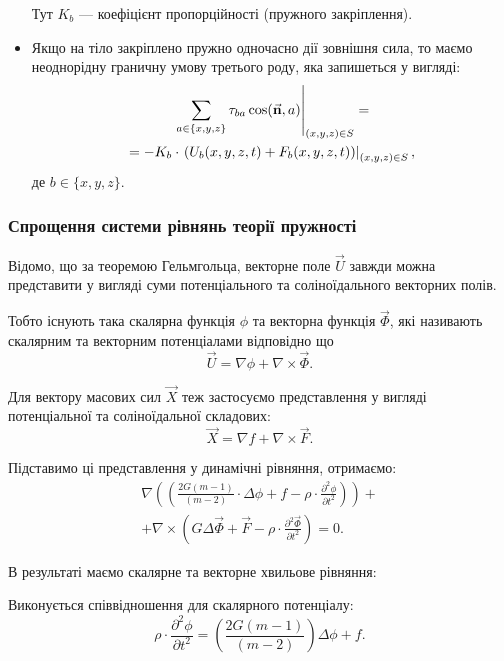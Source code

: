 \begin{itemize}
	\begin{remark}
		Тут $K_b$ --- коефіцієнт пропорційності (пружного закріплення).
	\end{remark}

	\item Якщо на тіло закріплено пружно одночасно дії зовнішня сила, то маємо неоднорідну граничну умову третього роду, яка запишеться у вигляді:
	\begin{multline}
		\left. \displaystyle\sum\limits_{a \in \{x, y, z\}} \tau_{b a} \cos(\vec{\textbf{n}}, a) \right|_{(x, y, z) \in S} = \\
		= - K_b \cdot \left. \left( U_b(x, y, z, t) + F_b(x, y, z, t) \right) \right|_{(x, y, z) \in S},
	\end{multline}
	де $b \in \{x, y, z\}$.
\end{itemize}

\subsubsection{Спрощення системи рівнянь теорії пружності}

Відомо, що за теоремою Гельмгольца, векторне поле $\vec U$ завжди можна представити у вигляді суми потенціального та соліноїдального векторних полів. \medskip

Тобто існують така скалярна функція $\phi$ та векторна функція $\vec \Phi$, які називають скалярним та векторним потенціалами відповідно що
\begin{equation}
	\vec U = \nabla \phi + \nabla \times \vec \Phi.
\end{equation}

Для вектору масових сил $\vec X$ теж застосуємо представлення у вигляді потенціальної та соліноїдальної складових:
\begin{equation}
	\vec X = \nabla f + \nabla \times \vec F.
\end{equation}

Підставимо ці представлення у динамічні рівняння, отримаємо:
\begin{multline}
	\nabla \left( \left( \frac{2 G (m - 1)}{(m - 2)} \cdot \Delta \phi + f - \rho \cdot \frac{\partial^2 \phi}{\partial t^2} \right) \right) + \\
	+ \nabla \times \left( G \Delta \vec \Phi + \Vec F - \rho \cdot \frac{\partial^2 \vec \Phi}{\partial t^2} \right) = 0.
\end{multline}

В результаті маємо  скалярне та векторне хвильове рівняння:
\begin{th_equation}
	Виконується співвідношення для скалярного потенціалу:
	\begin{equation}
		\rho \cdot \frac{\partial^2 \phi}{\partial t^2} = \left( \frac{2 G (m - 1)}{(m - 2)} \right) \Delta \phi + f.
	\end{equation}
\end{th_equation}

